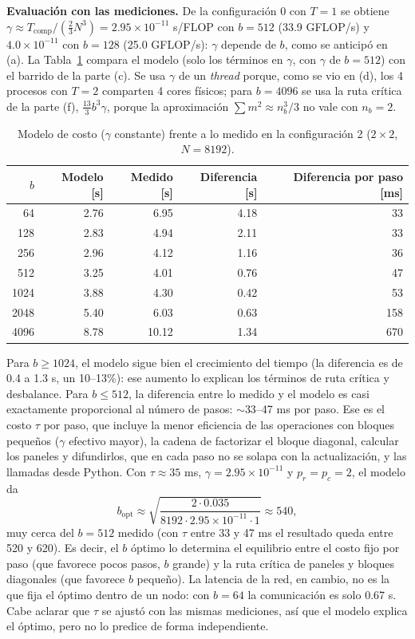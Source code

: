 \documentclass[11pt,a4paper]{article}
\newcommand{\Tcomp}{T_{\text{comp}}}
\begin{document}
\textbf{Evaluación con las mediciones.} De la configuración 0 con $T=1$ se obtiene $\gamma\approx\Tcomp/(\tfrac{2}{3}N^3)=2.95\times10^{-11}$ s/FLOP con $b=512$ (33.9 GFLOP/s) y $4.0\times10^{-11}$ con $b=128$ (25.0 GFLOP/s): $\gamma$ depende de $b$, como se anticipó en (a). La Tabla~\ref{tab:g} compara el modelo (solo los términos en $\gamma$, con $\gamma$ de $b=512$) con el barrido de la parte (c). Se usa $\gamma$ de un \emph{thread} porque, como se vio en (d), los 4 procesos con $T=2$ comparten 4 cores físicos; para $b=4096$ se usa la ruta crítica de la parte (f), $\tfrac{13}{3}b^3\gamma$, porque la aproximación $\sum m^2\approx n_b^3/3$ no vale con $n_b=2$.

\begin{table}[H]
\centering\small
\caption{Modelo de costo ($\gamma$ constante) frente a lo medido en la configuración 2 ($2\times2$, $N=8192$).}
\label{tab:g}
\begin{tabular}{rrrrr}
\toprule
$b$ & Modelo [s] & Medido [s] & Diferencia [s] & Diferencia por paso [ms] \\
\midrule
64   & 2.76 & 6.95 & 4.18 & 33 \\
128  & 2.83 & 4.94 & 2.11 & 33 \\
256  & 2.96 & 4.12 & 1.16 & 36 \\
512  & 3.25 & 4.01 & 0.76 & 47 \\
1024 & 3.88 & 4.30 & 0.42 & 53 \\
2048 & 5.40 & 6.03 & 0.63 & 158 \\
4096 & 8.78 & 10.12 & 1.34 & 670 \\
\bottomrule
\end{tabular}
\end{table}

Para $b\ge1024$, el modelo sigue bien el crecimiento del tiempo (la diferencia es de 0.4 a 1.3 s, un 10--13\%): ese aumento lo explican los términos de ruta crítica y desbalance. Para $b\le512$, la diferencia entre lo medido y el modelo es casi exactamente proporcional al número de pasos: $\sim33$--47 ms por paso. Ese es el costo $\tau$ por paso, que incluye la menor eficiencia de las operaciones con bloques pequeños ($\gamma$ efectivo mayor), la cadena de factorizar el bloque diagonal, calcular los paneles y difundirlos, que en cada paso no se solapa con la actualización, y las llamadas desde Python. Con $\tau\approx35$ ms, $\gamma=2.95\times10^{-11}$ y $p_r=p_c=2$, el modelo da
\[
b_{\text{opt}}\approx\sqrt{\frac{2\cdot0.035}{8192\cdot2.95\times10^{-11}\cdot1}}\approx540,
\]
muy cerca del $b=512$ medido (con $\tau$ entre 33 y 47 ms el resultado queda entre 520 y 620). Es decir, el $b$ óptimo lo determina el equilibrio entre el costo fijo por paso (que favorece pocos pasos, $b$ grande) y la ruta crítica de paneles y bloques diagonales (que favorece $b$ pequeño). La latencia de la red, en cambio, no es la que fija el óptimo dentro de un nodo: con $b=64$ la comunicación es solo 0.67 s. Cabe aclarar que $\tau$ se ajustó con las mismas mediciones, así que el modelo explica el óptimo, pero no lo predice de forma independiente.
\end{document}
